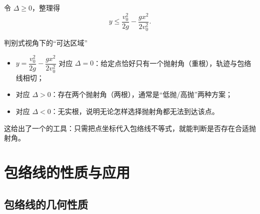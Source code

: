 \documentclass[a4paper,11pt]{ctexart}
\begin{document}
令 $\Delta \geq 0$，整理得
\begin{equation}
  y \leq \frac{v_0^2}{2g} - \frac{gx^2}{2v_0^2}.
\end{equation}

\begin{summarybox}{判别式视角下的“可达区域”}
\begin{itemize}
  \item {} $y = \dfrac{v_0^2}{2g} - \dfrac{gx^2}{2v_0^2}$ 对应 $\Delta = 0$：给定点恰好只有一个抛射角（重根），轨迹与包络线相切；
  \item {}对应 $\Delta > 0$：存在两个抛射角（两根），通常是“低抛/高抛”两种方案；
  \item {}对应 $\Delta < 0$：无实根，说明无论怎样选择抛射角都无法到达该点。
\end{itemize}
\end{summarybox}

这给出了一个的工具：只需把点坐标代入包络线不等式，就能判断是否存在合适抛射角。

\section{包络线的性质与应用}

\subsection{包络线的几何性质}
\end{document}
